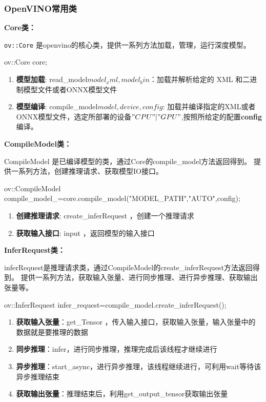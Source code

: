 \subsubsection{OpenVINO常用类}
\textbf{Core类：}

\texttt{ov::Core} 是openvino的核心类，提供一系列方法加载，管理，运行深度模型。

\begin{tcode}
    ov::Core core;
\end{tcode}

\begin{enumerate}
    \item \textbf{模型加载}: read\_model\(model_xml, model_bin\)：加载并解析给定的 XML 和二进制模型文件或者ONNX模型文件
    \item \textbf{模型编译}: compile\_model\(model,device,config\): 加载并编译指定的XML或者ONNX模型文件，选定所部署的设备\("CPU" | "GPU"\),按照所给定的配置\textbf{config}编译。
\end{enumerate}

\textbf{CompileModel类：}

CompileModel 是已编译模型的类，通过Core的compile\_model方法返回得到。
提供一系列方法，创建推理请求、获取模型IO接口。

\begin{tcode}
    ov::CompileModel compile_model_=core.compile_model("MODEL_PATH","AUTO",config);
\end{tcode}

\begin{enumerate}
    \item \textbf{创建推理请求}: create\_inferRequest\(\) ，创建一个推理请求
    \item \textbf{获取输入接口}: input\(\) ，返回模型的输入接口
\end{enumerate}

\textbf{InferRequest类：}

inferRequest是推理请求类，通过CompileModel的create\_inferRequest方法返回得到。
提供一系列方法，获取输入张量、进行同步推理、进行异步推理、获取输出张量等。

\begin{tcode}
    ov::InferRequest infer_request=compile_model.create_inferRequest();
\end{tcode}

\begin{enumerate}
    \item \textbf{获取输入张量}：get\_Tensor ，传入输入接口，获取输入张量，输入张量中的数据就是要推理的数据
    \item \textbf{同步推理}：infer，进行同步推理，推理完成后该线程才继续进行
    \item \textbf{异步推理}：start\_async，进行异步推理，该线程继续进行，可利用wait等待该异步推理结束
    \item \textbf{获取输出张量}：推理结束后，利用get\_output\_tensor获取输出张量
\end{enumerate}


